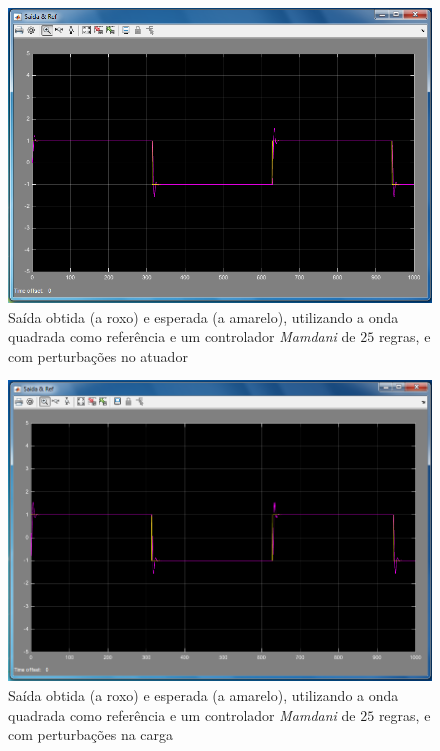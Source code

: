\documentclass{article}
\begin{document}
\begin{figure}[h]
  \centering
      \includegraphics[scale=0.3]{Images/Mamdani_25_square_actuator.png}
  \caption{Saída obtida (a roxo) e esperada (a amarelo), utilizando a onda quadrada como referência e um controlador \emph{Mamdani} de $25$ regras, e com perturbações no atuador}
\end{figure}

\begin{figure}[h]
  \centering
      \includegraphics[scale=0.3]{Images/Mamdani_25_square_charge.png}
  \caption{Saída obtida (a roxo) e esperada (a amarelo), utilizando a onda quadrada como referência e um controlador \emph{Mamdani} de $25$ regras, e com perturbações na carga}
\end{figure}
\end{document}
